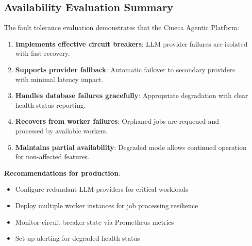 \subsection{Availability Evaluation Summary}

The fault tolerance evaluation demonstrates that the Cineca Agentic Platform:

\begin{enumerate}
    \item \textbf{Implements effective circuit breakers}: LLM provider failures are isolated with fast recovery.
    
    \item \textbf{Supports provider fallback}: Automatic failover to secondary providers with minimal latency impact.
    
    \item \textbf{Handles database failures gracefully}: Appropriate degradation with clear health status reporting.
    
    \item \textbf{Recovers from worker failures}: Orphaned jobs are requeued and processed by available workers.
    
    \item \textbf{Maintains partial availability}: Degraded mode allows continued operation for non-affected features.
\end{enumerate}

\textbf{Recommendations for production}:
\begin{itemize}
    \item Configure redundant LLM providers for critical workloads
    \item Deploy multiple worker instances for job processing resilience
    \item Monitor circuit breaker state via Prometheus metrics
    \item Set up alerting for degraded health status
\end{itemize}

